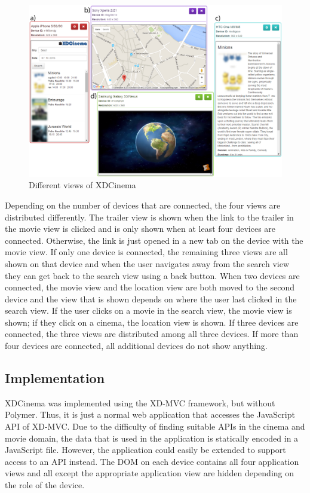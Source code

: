 \begin{figure}[H]
  \centering
    \includegraphics[width=1.0\textwidth]{images/screenshots/xdcinema_5_labeled.png}
	\caption[Screenshot XDCinema: Different views]{Different views of XDCinema}
	\label{fig:xdcinema}
\end{figure}

Depending on the number of devices that are connected, the four views are distributed differently. The trailer view is shown when the link to the trailer in the movie view is clicked and is only shown when at least four devices are connected. Otherwise, the link is just opened in a new tab on the device with the movie view. If only one device is connected, the remaining three views are all shown on that device and when the user navigates away from the search view they can get back to the search view using a back button. When two devices are connected, the movie view and the location view are both moved to the second device and the view that is shown depends on where the user last clicked in the search view. If the user clicks on a movie in the search view, the movie view is shown; if they click on a cinema, the location view is shown. If three devices are connected, the three views are distributed among all three devices. If more than four devices are connected, all additional devices do not show anything.

\subsection{Implementation}

XDCinema was implemented using the XD-MVC framework, but without Polymer. Thus, it is just a normal web application that accesses the JavaScript API of XD-MVC. Due to the difficulty of finding suitable APIs in the cinema and movie domain, the data that is used in the application is statically encoded in a JavaScript file. However, the application could easily be extended to support access to an API instead. The DOM on each device contains all four application views and all except the appropriate application view are hidden depending on the role of the device. 

